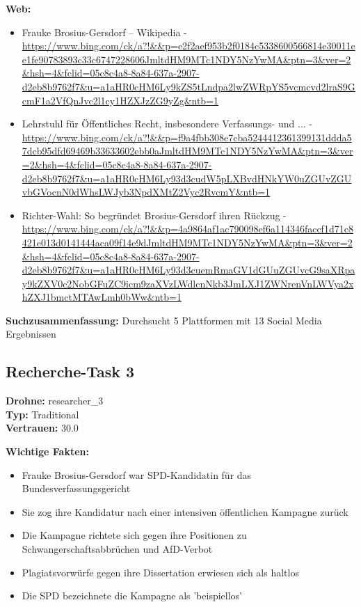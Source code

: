\documentclass[12pt,a4paper]{article}
\begin{document}
\textbf{Web:}
\begin{itemize}
\item Frauke Brosius-Gersdorf – Wikipedia - \url{https://www.bing.com/ck/a?!&&p=e2f2aef953b2f0184c5338600566814e30011ee1fe90783893c33c6747228606JmltdHM9MTc1NDY5NzYwMA&ptn=3&ver=2&hsh=4&fclid=05c8c4a8-8a84-637a-2907-d2eb8b9762f7&u=a1aHR0cHM6Ly9kZS5tLndpa2lwZWRpYS5vcmcvd2lraS9GcmF1a2VfQnJvc2l1cy1HZXJzZG9yZg&ntb=1}
\item Lehrstuhl für Öffentliches Recht, insbesondere Verfassungs- und ... - \url{https://www.bing.com/ck/a?!&&p=f9a4fbb308e7cba5244412361399131ddda57dcb95dfd69469b33633602ebb0aJmltdHM9MTc1NDY5NzYwMA&ptn=3&ver=2&hsh=4&fclid=05c8c4a8-8a84-637a-2907-d2eb8b9762f7&u=a1aHR0cHM6Ly93d3cudW5pLXBvdHNkYW0uZGUvZGUvbGVocnN0dWhsLWJyb3NpdXMtZ2Vyc2RvcmY&ntb=1}
\item Richter-Wahl: So begründet Brosius-Gersdorf ihren Rückzug - \url{https://www.bing.com/ck/a?!&&p=4a9864af1ac790098ef6a114346faccf1d71c8421e013d0141444aca09f14e9dJmltdHM9MTc1NDY5NzYwMA&ptn=3&ver=2&hsh=4&fclid=05c8c4a8-8a84-637a-2907-d2eb8b9762f7&u=a1aHR0cHM6Ly93d3cuemRmaGV1dGUuZGUvcG9saXRpay9kZXV0c2NobGFuZC9icm9zaXVzLWdlcnNkb3JmLXJ1ZWNrenVnLWVya2xhZXJ1bmctMTAwLmh0bWw&ntb=1}
\end{itemize}

\textbf{Suchzusammenfassung:} Durchsucht 5 Plattformen mit 13 Social Media Ergebnissen

\subsection{Recherche-Task 3}

\textbf{Drohne:} researcher\_3\\
\textbf{Typ:} Traditional\\
\textbf{Vertrauen:} 30.0%

\textbf{Wichtige Fakten:}
\begin{itemize}
\item Frauke Brosius-Gersdorf war SPD-Kandidatin für das Bundesverfassungsgericht
\item Sie zog ihre Kandidatur nach einer intensiven öffentlichen Kampagne zurück
\item Die Kampagne richtete sich gegen ihre Positionen zu Schwangerschaftsabbrüchen und AfD-Verbot
\item Plagiatsvorwürfe gegen ihre Dissertation erwiesen sich als haltlos
\item Die SPD bezeichnete die Kampagne als 'beispiellos'
\end{itemize}
\end{document}
